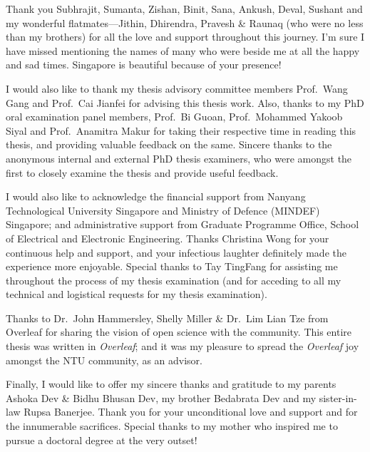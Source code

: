 Thank you Subhrajit, Sumanta, Zishan, Binit, Sana, Ankush, Deval, Sushant and my wonderful flatmates---Jithin, Dhirendra, Pravesh \& Raunaq (who were no less than my brothers) for all the love and support throughout this journey. I'm sure I have missed mentioning the names of many who were beside me at all the happy and sad times. Singapore is beautiful because of your presence! 

I would also like to thank my thesis advisory committee members Prof.\ Wang Gang and Prof.\ Cai Jianfei for advising this thesis work. Also, thanks to my PhD oral examination panel members, Prof.\ Bi Guoan, Prof.\ Mohammed Yakoob Siyal and Prof.\ Anamitra Makur for taking their respective time in reading this thesis, and providing valuable feedback on the same. Sincere thanks to the anonymous internal and external PhD thesis examiners, who were amongst the first to closely examine the thesis and provide useful feedback.

I would also like to acknowledge the financial support from Nanyang Technological University Singapore and Ministry of Defence (MINDEF) Singapore; and administrative support from Graduate Programme Office, School of Electrical and Electronic Engineering. Thanks Christina Wong for your continuous help and support, and your infectious laughter definitely made the experience more enjoyable. Special thanks to Tay TingFang for assisting me throughout the process of my thesis examination (and for acceding to all my technical and logistical requests for my thesis examination).

Thanks to Dr.\ John Hammersley, Shelly Miller \& Dr.\ Lim Lian Tze from Overleaf for sharing the vision of open science with the community. This entire thesis was written in \emph{Overleaf}; and it was my pleasure to spread the \emph{Overleaf} joy amongst the NTU community, as an advisor.

Finally, I would like to offer my sincere thanks and gratitude to my parents Ashoka Dev \& Bidhu Bhusan Dev, my brother Bedabrata Dev and my sister-in-law Rupsa Banerjee. Thank you for your unconditional love and support and for the innumerable sacrifices. Special thanks to my mother who inspired me to pursue a doctoral degree at the very outset! 









